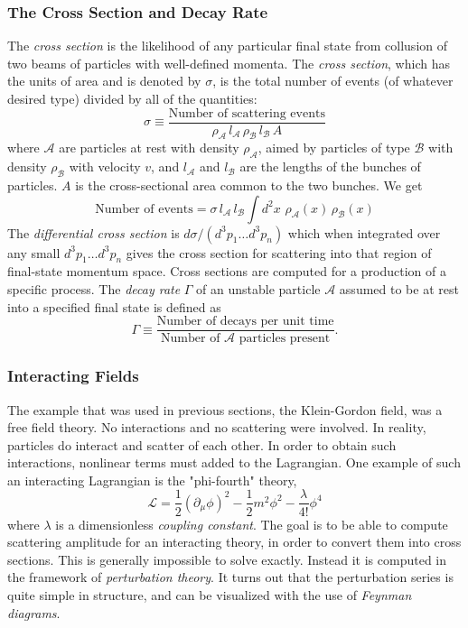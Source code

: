 \subsubsection{The Cross Section and Decay Rate}

The \emph{cross section} is the likelihood of any particular final state from collusion of two beams of particles with well-defined momenta. The \emph{cross section}, which has the units of area and is denoted by $\sigma$, is the total number of events (of whatever desired type) divided by all of the quantities:
\begin{equation}
\sigma \equiv \frac{\text{Number of scattering events}}{\rho_\mathcal{A}\,l_\mathcal{A}\,\rho_\mathcal{B}\,l_\mathcal{B}\,A}
\end{equation}
where $\mathcal{A}$ are particles at rest with density $\rho_\mathcal{A}$, aimed by particles of type $\mathcal{B}$ with density $\rho_\mathcal{B}$ with velocity $v$, and $l_\mathcal{A}$ and $l_\mathcal{B}$ are the lengths of the bunches of particles. $A$ is the cross-sectional area common to the two bunches. We get
\begin{equation}
\text{Number of events} = \sigma\,l_\mathcal{A}\,l_\mathcal{B}\int d^2 x\,\, \rho_\mathcal{A}(x)\,\rho_\mathcal{B}(x)
\end{equation}
The \emph{differential cross section} is $d\sigma/(d^3 p_1\ldots d^3p_n)$ which when integrated over any small $d^3 p_1\ldots d^3p_n$ gives the cross section for scattering into that region of final-state momentum space. Cross sections are computed for a production of a specific process. The \emph{decay rate} $\Gamma$ of an unstable particle $\mathcal{A}$ assumed to be at rest into a specified final state is defined as
\begin{equation}
\Gamma \equiv \frac{\text{Number of decays per unit time}}{\text{Number of $\mathcal{A}$ particles present}}.
\end{equation}

\subsubsection{Interacting Fields}

The example that was used in previous sections, the Klein-Gordon field, was a free field theory. No interactions and no scattering were involved. In reality, particles do interact and scatter of each other. In order to obtain such interactions, nonlinear terms must added to the Lagrangian. One example of such an interacting Lagrangian is the "phi-fourth" theory,
\begin{equation}
\mathcal{L} = \frac{1}{2}(\partial_\mu\phi)^2-\frac{1}{2}m^2\phi^2 -\frac{\lambda}{4!}\phi^4
\end{equation}
where $\lambda$ is a dimensionless \emph{coupling constant}. The goal is to be able to compute scattering amplitude for an interacting theory, in order to convert them into cross sections. This is generally impossible to solve exactly. Instead it is computed in the framework of \emph{perturbation theory}. It turns out that the perturbation series is quite simple in structure, and can be visualized with the use of \emph{Feynman diagrams}.

